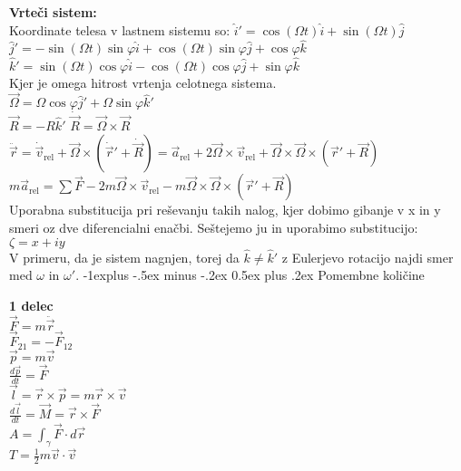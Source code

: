 \documentclass[12pt,landscape]{article}
\makeatletter
\renewcommand{\subsection}{\@startsection{subsection}{2}{0mm}%
                                {-1explus -.5ex minus -.2ex}%
                                {0.5ex plus .2ex}%
                                {\normalfont\normalsize\bfseries}}
\newcommand{\rv}{\vec{r}}
\newcommand{\vv}{\vec{v}}
\newcommand{\av}{\vec{a}}
\newcommand{\F}{\vec{F}}
\makeatother
\begin{document}
\begin{multicols}{3}
\textbf{Vrteči sistem:} \\
Koordinate telesa v lastnem sistemu so:
$\hat i' = \cos(\Omega t) \hat i + \sin(\Omega t) \hat j$ \\
$\hat j' = - \sin(\Omega t) \sin \varphi \hat i + \cos(\Omega t) \sin \varphi \hat j + \cos \varphi \hat k$ \\
$\hat k' = \sin(\Omega t) \cos \varphi \hat i - \cos(\Omega t) \cos \varphi \hat j + \sin \varphi \hat k$ \\
Kjer je omega hitrost vrtenja celotnega sistema. \medskip \\
$\vec \Omega = \Omega \cos \varphi \hat j' + \Omega \sin \varphi \hat k'$ \\
$\vec R = -R \hat k'$ \qquad $\dot{\vec R} = \vec \Omega \times \vec R$ \\
$\ddot \rv = \dot{\vv}_\mathrm{rel} + \vec \Omega \times \left( \dot \rv' + \dot{\vec R} \right) = \av_\mathrm{rel} + 2 \vec \Omega \times \vv_\mathrm{rel} + \vec \Omega \times \vec \Omega \times \left( \rv' + \vec R \right)$ \\
$m\av_\mathrm{rel} = \sum \F - 2 m\vec \Omega \times \vv_\mathrm{rel} - m \vec \Omega \times \vec \Omega \times \left( \rv' + \vec R \right)$ \medskip \\
Uporabna substitucija pri reševanju takih nalog, kjer dobimo gibanje v x in y smeri oz dve diferencialni enačbi. Seštejemo ju in uporabimo substitucijo:
$\zeta=x+iy$ \medskip \\
V primeru, da je sistem nagnjen, torej da $\hat{k} \neq \hat{k}'$ z Eulerjevo rotacijo najdi smer med $\omega$ in $\omega'$.
\subsection{Pomembne količine}

\textbf{1 delec} \\

$\F = m \ddot \rv$ \\
$\F_{21} = - \F_{12}$ \smallskip \\

$\vec p = m \vec v$ \\
$\frac{d \vec p}{dt} = \F$ \smallskip \\

$\vec l = \rv \times \vec p = m\rv \times \vv$ \\
$\frac{d \vec l}{dt} = \vec M = \rv \times \F$ \smallskip \\

$A = \int_\gamma \F \cdot d\rv$ \\
$T = \frac{1}{2} m \vv \cdot \vv$ \smallskip \\


\end{multicols}
\end{document}
